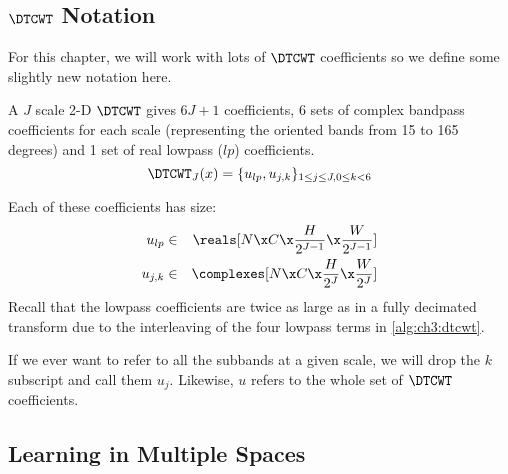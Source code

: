 \subsection{$\DTCWT$ Notation}
For this chapter, we will work with lots of $\DTCWT$ coefficients so we define
some slightly new notation here.

A $J$ scale 2-D $\DTCWT$ gives $6J+1$ coefficients, 6 sets of complex
bandpass coefficients for each scale (representing the oriented bands from 15 to 165
degrees) and 1 set of real lowpass ($lp$) coefficients. 
\begin{equation}
  \DTCWT_J(x) = \{ u_{lp}, u_{j,k} \}_{1\leq j\leq J, 0\leq k < 6}
  \label{eq:ch6:dtcwt_coeffs}
\end{equation}

Each of these coefficients has size:
%
\begin{eqnarray}
  u_{lp} &\in & \reals[N\x C\x \frac{H}{2^{J-1}} \x \frac{W}{2^{J-1}}] \\
  u_{j,k} &\in & \complexes[N\x C\x \frac{H}{2^{J}}\x \frac{W}{2^{J}}]
\end{eqnarray}
%
Recall that the lowpass coefficients are twice as large as in a fully decimated
transform due to the interleaving of the four lowpass terms in \autoref{alg:ch3:dtcwt}.

If we ever want to refer to all the subbands at a given scale, we will
drop the $k$ subscript and call them $u_j$. Likewise, $u$ refers to the whole
set of $\DTCWT$ coefficients.

\subsection{Learning in Multiple Spaces}\label{sec:ch6:learning}

